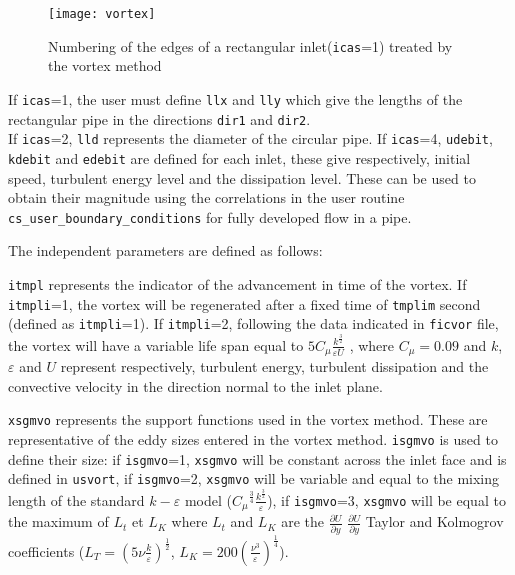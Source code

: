 {{{\begin{list}{-}{}
\begin{figure}[!ht]
\centerline{
\texttt{[image: vortex]}}
\caption{Numbering of the edges of a rectangular inlet(\texttt{icas}=1)
 treated by the vortex method}\label{fig:vortex}
\end{figure}

If \texttt{icas}=1, the user must define \texttt{llx} and \texttt{lly} which give
the lengths of the rectangular pipe in the directions \texttt{dir1} and \texttt{dir2}.\\
If \texttt{icas}=2, \texttt{lld} represents the diameter of the circular pipe.
If \texttt{icas}=4, \texttt{udebit}, \texttt{kdebit} and \texttt{edebit} are
defined for each inlet, these give respectively,
initial speed, turbulent energy level and the dissipation level. These can be used to
 obtain their magnitude using the correlations in the user routine \texttt{cs\_user\_boundary\_conditions} for
 fully developed flow in a pipe.

 The independent parameters are defined as follows:
\begin{list}{*}{}
\item \texttt{itmpl} represents the indicator of the advancement in time of the
  vortex. If \texttt{itmpli}=1, the vortex will be regenerated after a fixed
  time of
  \texttt{tmplim} second (defined as \texttt{itmpli}=1).
  If \texttt{itmpli}=2, following the data indicated in \texttt{ficvor} file,
  the vortex will have a variable life span equal to
  $5 \displaystyle C_\mu \displaystyle \frac{k^{\frac{3}{2}}}{\varepsilon U}$ ,
  where $C_\mu=0.09$ and $k$, $\varepsilon$ and $U$  represent respectively, turbulent energy,
  turbulent dissipation and the convective velocity in the direction normal to the inlet plane.

\item \texttt{xsgmvo} represents the support functions used in the vortex
  method. These are representative of the eddy sizes entered in the vortex
  method.
  \texttt{isgmvo} is used to define their size: if \texttt{isgmvo}=1,
  \texttt{xsgmvo} will be constant across the inlet face and is defined in
  \texttt{usvort}, if \texttt{isgmvo}=2, \texttt{xsgmvo} will be variable and
  equal to the mixing length of the standard $k-\varepsilon$ model
  ($\displaystyle {C_\mu}^{\frac{3}{4}} \displaystyle \frac{k^{\frac{3}{2}}}{\varepsilon}$), if
  \texttt{isgmvo}=3, \texttt{xsgmvo} will be equal to the maximum of $L_t$ et
  $L_K$ where $L_t$ and $L_K$ are the $\displaystyle \frac{\partial U}{\partial y}$
  $\displaystyle \frac{\partial U}{\partial y}$
  Taylor and Kolmogrov coefficients
  ($\displaystyle L_T=(5 \nu \frac{k}{\displaystyle \varepsilon})^{\frac{1}{2}}$,
  $\displaystyle L_K= 200 (\frac{\nu^3}{\varepsilon})^{\frac{1}{4}}$).


\end{list}
\end{list}}}}
